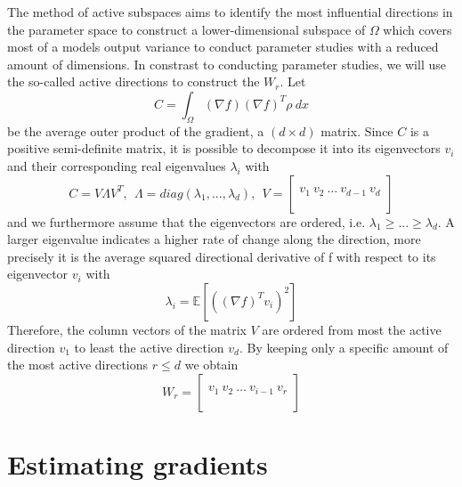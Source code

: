 \documentclass[
  a4paper,  %
  twoside,  %
  bibliography=totoc,
  headsepline,
  cleardoublepage=empty,
  parskip=half,
  draft=false
]{scrbook}
\begin{document}
The method of active subspaces \cite{CG15} aims to identify the most influential directions in the parameter space to construct a lower-dimensional subspace of $\Omega$ which covers most of a models output variance to conduct parameter studies with a reduced amount of dimensions.
In constrast to conducting parameter studies, we will use the so-called active directions to construct the $W_r$.
Let
\begin{equation}
C = \int_{\Omega} (\nabla f) (\nabla f)^T \rho ~ dx
\label{as_c}
\end{equation}
be the average outer product of the gradient, a $(d \times d)$ matrix.
Since $C$ is a positive semi-definite matrix, it is possible to decompose it into its eigenvectors $v_i$ and their corresponding real eigenvalues $\lambda_i$ with
\begin{equation}
C = V \Lambda V^T, ~~ \Lambda = diag(\lambda_1, ..., \lambda_d), ~~ V=
  \begin{bmatrix}
  \\
    v_1 ~ v_2 ~ \dots ~ v_{d-1} ~ v_d\\
    \\
  \end{bmatrix}
\nonumber
\end{equation}
and we furthermore assume that the eigenvectors are ordered, i.e. $\lambda_1 \geq ... \geq \lambda_d$.
A larger eigenvalue indicates a higher rate of change along the direction, more precisely it is the average squared directional derivative of f with respect to its eigenvector $v_i$ \cite{CG14} with
\begin{equation}
\lambda_i=\mathds{E}[((\nabla f)^T v_i)^2]
\label{eigenvalues}
\end{equation}
Therefore, the column vectors of the matrix $V$ are ordered from most the active direction $v_1$ to least the active direction $v_d$.
By keeping only a specific amount of the most active directions $r \leq d$ we obtain
\begin{equation}
W_r=\begin{bmatrix}
  \\
    v_1 ~ v_2 ~ \dots ~ v_{i-1} ~ v_r\\
    \\
  \end{bmatrix}
\label{basis}
\end{equation}



\section{Estimating gradients}
\end{document}
